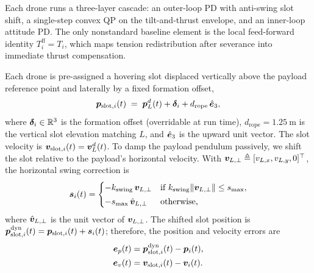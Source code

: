 Each drone runs a three-layer cascade: an outer-loop PD with anti-swing slot shift, a single-step convex QP on the tilt-and-thrust envelope, and an inner-loop attitude PD. The only nonstandard baseline element is the local feed-forward identity $T_i^{\mathrm{ff}}=T_i$, which maps tension redistribution after severance into immediate thrust compensation.



Each drone is pre-assigned a hovering slot displaced vertically above the payload reference point and laterally by a fixed formation offset,
\begin{equation}
  \boldsymbol{p}_{\mathrm{slot},i}(t)
    \;=\; \boldsymbol{p}_L^d(t) + \boldsymbol\delta_i
        + d_{\mathrm{rope}}\,\hat{\boldsymbol{e}}_3,
  \label{eq:slot-pos}
\end{equation}
where $\boldsymbol\delta_i \in \mathbb{R}^3$ is the formation offset (overridable at run time), $d_{\mathrm{rope}} = \SI{1.25}{\metre}$ is the vertical slot elevation matching $L$, and $\hat{\boldsymbol{e}}_3$ is the upward unit vector. The slot velocity is $\boldsymbol{v}_{\mathrm{slot},i}(t) = \boldsymbol{v}_L^d(t)$. To damp the payload pendulum passively, we shift the slot relative to the payload's horizontal velocity. With $\boldsymbol{v}_{L,\perp} \triangleq [v_{L,x}, v_{L,y}, 0]^{\top}$, the horizontal swing correction is
\begin{equation}
  \boldsymbol{s}_i(t) =
    \begin{cases}
      -k_{\mathrm{swing}}\,\boldsymbol{v}_{L,\perp}
        & \text{if }
          k_{\mathrm{swing}}\|\boldsymbol{v}_{L,\perp}\| \le s_{\max}, \\[2pt]
      -s_{\max}\,\hat{\boldsymbol{v}}_{L,\perp}
        & \text{otherwise,}
    \end{cases}
  \label{eq:swing-shift}
\end{equation}
where $\hat{\boldsymbol{v}}_{L,\perp}$ is the unit vector of $\boldsymbol{v}_{L,\perp}$. The shifted slot position is $\boldsymbol{p}_{\mathrm{slot},i}^{\mathrm{dyn}}(t) = \boldsymbol{p}_{\mathrm{slot},i}(t) + \boldsymbol{s}_i(t)$; therefore, the position and velocity errors are
\begin{align}
    \label{eq:slot-error}
  \boldsymbol{e}_p(t) &= \boldsymbol{p}_{\mathrm{slot},i}^{\mathrm{dyn}}(t)
                 - \boldsymbol{p}_i(t),\\
  \boldsymbol{e}_v(t) &= \boldsymbol{v}_{\mathrm{slot},i}(t) - \boldsymbol{v}_i(t).\nonumber
\end{align}

